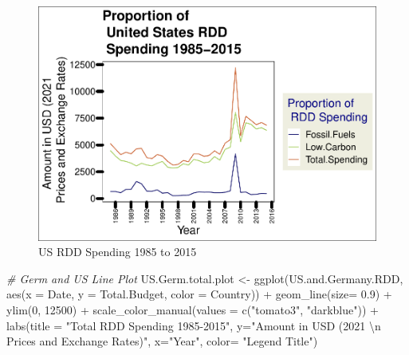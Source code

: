 \documentclass[
  12pt,
]{article}
\newenvironment{Shaded}{\begin{snugshade}}{\end{snugshade}}
\newcommand{\AttributeTok}[1]{\textcolor[rgb]{0.77,0.63,0.00}{#1}}
\newcommand{\CommentTok}[1]{\textcolor[rgb]{0.56,0.35,0.01}{\textit{#1}}}
\newcommand{\DecValTok}[1]{\textcolor[rgb]{0.00,0.00,0.81}{#1}}
\newcommand{\FloatTok}[1]{\textcolor[rgb]{0.00,0.00,0.81}{#1}}
\newcommand{\FunctionTok}[1]{\textcolor[rgb]{0.00,0.00,0.00}{#1}}
\newcommand{\NormalTok}[1]{#1}
\newcommand{\OtherTok}[1]{\textcolor[rgb]{0.56,0.35,0.01}{#1}}
\newcommand{\SpecialCharTok}[1]{\textcolor[rgb]{0.00,0.00,0.00}{#1}}
\newcommand{\StringTok}[1]{\textcolor[rgb]{0.31,0.60,0.02}{#1}}
\begin{document}
\begin{figure}
\centering
\includegraphics{Chang_Jenkins_Mullens_ENV872_Final_files/figure-latex/Line Plot of All US RDD-1.pdf}
\caption{US RDD Spending 1985 to 2015}
\end{figure}

\begin{Shaded}
\begin{Highlighting}[]
\CommentTok{\# Germ and US Line Plot}
\NormalTok{US.Germ.total.plot }\OtherTok{\textless{}{-}} \FunctionTok{ggplot}\NormalTok{(US.and.Germany.RDD,}
                              \FunctionTok{aes}\NormalTok{(}\AttributeTok{x =}\NormalTok{ Date,}
                                  \AttributeTok{y =}\NormalTok{ Total.Budget, }
                                  \AttributeTok{color =}\NormalTok{ Country)) }\SpecialCharTok{+} 
  \FunctionTok{geom\_line}\NormalTok{(}\AttributeTok{size=} \FloatTok{0.9}\NormalTok{) }\SpecialCharTok{+}
  \FunctionTok{ylim}\NormalTok{(}\DecValTok{0}\NormalTok{, }\DecValTok{12500}\NormalTok{) }\SpecialCharTok{+}
  \FunctionTok{scale\_color\_manual}\NormalTok{(}\AttributeTok{values =} \FunctionTok{c}\NormalTok{(}\StringTok{"tomato3"}\NormalTok{, }\StringTok{"darkblue"}\NormalTok{)) }\SpecialCharTok{+}
  \FunctionTok{labs}\NormalTok{(}\AttributeTok{title =} \StringTok{"Total RDD Spending 1985{-}2015"}\NormalTok{,}
       \AttributeTok{y=}\StringTok{"Amount in USD (2021 }\SpecialCharTok{\textbackslash{}n}\StringTok{ Prices and Exchange Rates)"}\NormalTok{,}
       \AttributeTok{x=}\StringTok{"Year"}\NormalTok{,}
       \AttributeTok{color=} \StringTok{"Legend Title"}\NormalTok{)}
\end{Highlighting}
\end{Shaded}
\end{document}
